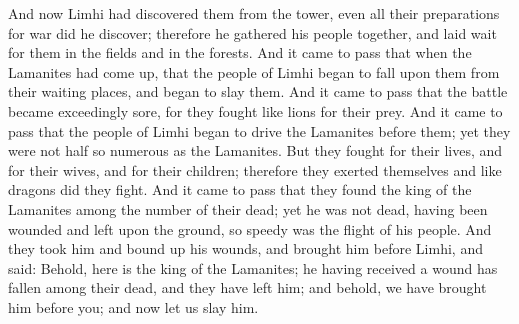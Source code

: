 \bverse \iffalse And now Limhi had discovered them from the tower, even all their preparations for war did he discover; therefore he gathered his people together, and laid wait for them in the fields and in the forests. \fi
And now Limhi had discovered them from the tower, even all their preparations for war did he discover; therefore he gathered his people together, and laid wait for them in the fields and in the forests.
\bverse \iffalse And it came to pass that when the Lamanites had come up, that the people of Limhi began to fall upon them from their waiting places, and began to slay them. \fi
And it came to pass that when the Lamanites had come up, that the people of Limhi began to fall upon them from their waiting places, and began to slay them.
\bverse \iffalse And it came to pass that the battle became exceedingly sore, for they fought like lions for their prey. \fi
And it came to pass that the battle became exceedingly sore, for they fought like lions for their prey.
\bverse \iffalse And it came to pass that the people of Limhi began to drive the Lamanites before them; yet they were not half so numerous as the Lamanites. But they fought for their lives, and for their wives, and for their children; therefore they exerted themselves and like dragons did they fight. \fi
And it came to pass that the people of Limhi began to drive the Lamanites before them; yet they were not half so numerous as the Lamanites. But they fought for their lives, and for their wives, and for their children; therefore they exerted themselves and like dragons did they fight.
\bverse \iffalse And it came to pass that they found the king of the Lamanites among the number of their dead; yet he was not dead, having been wounded and left upon the ground, so speedy was the flight of his people. \fi
And it came to pass that they found the king of the Lamanites among the number of their dead; yet he was not dead, having been wounded and left upon the ground, so speedy was the flight of his people.
\bverse \iffalse And they took him and bound up his wounds, and brought him before Limhi, and said: Behold, here is the king of the Lamanites; he having received a wound has fallen among their dead, and they have left him; and behold, we have brought him before you; and now let us slay him. \fi
And they took him and bound up his wounds, and brought him before Limhi, and said: Behold, here is the king of the Lamanites; he having received a wound has fallen among their dead, and they have left him; and behold, we have brought him before you; and now let us slay him.
